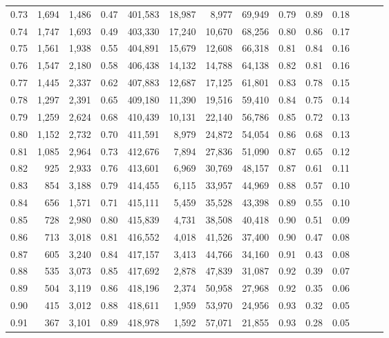 \begin{tabular}{rrrrrrrrrrrrrr}
0.73 &  1,694 &  1,486 &  0.47 &  401,583 &   18,987 &   8,977 &  69,949 &  0.79 &  0.89 &      0.18 \\
0.74 &  1,747 &  1,693 &  0.49 &  403,330 &   17,240 &  10,670 &  68,256 &  0.80 &  0.86 &      0.17 \\
0.75 &  1,561 &  1,938 &  0.55 &  404,891 &   15,679 &  12,608 &  66,318 &  0.81 &  0.84 &      0.16 \\
0.76 &  1,547 &  2,180 &  0.58 &  406,438 &   14,132 &  14,788 &  64,138 &  0.82 &  0.81 &      0.16 \\
0.77 &  1,445 &  2,337 &  0.62 &  407,883 &   12,687 &  17,125 &  61,801 &  0.83 &  0.78 &      0.15 \\
0.78 &  1,297 &  2,391 &  0.65 &  409,180 &   11,390 &  19,516 &  59,410 &  0.84 &  0.75 &      0.14 \\
0.79 &  1,259 &  2,624 &  0.68 &  410,439 &   10,131 &  22,140 &  56,786 &  0.85 &  0.72 &      0.13 \\
0.80 &  1,152 &  2,732 &  0.70 &  411,591 &    8,979 &  24,872 &  54,054 &  0.86 &  0.68 &      0.13 \\
0.81 &  1,085 &  2,964 &  0.73 &  412,676 &    7,894 &  27,836 &  51,090 &  0.87 &  0.65 &      0.12 \\
0.82 &    925 &  2,933 &  0.76 &  413,601 &    6,969 &  30,769 &  48,157 &  0.87 &  0.61 &      0.11 \\
0.83 &    854 &  3,188 &  0.79 &  414,455 &    6,115 &  33,957 &  44,969 &  0.88 &  0.57 &      0.10 \\
0.84 &    656 &  1,571 &  0.71 &  415,111 &    5,459 &  35,528 &  43,398 &  0.89 &  0.55 &      0.10 \\
0.85 &    728 &  2,980 &  0.80 &  415,839 &    4,731 &  38,508 &  40,418 &  0.90 &  0.51 &      0.09 \\
0.86 &    713 &  3,018 &  0.81 &  416,552 &    4,018 &  41,526 &  37,400 &  0.90 &  0.47 &      0.08 \\
0.87 &    605 &  3,240 &  0.84 &  417,157 &    3,413 &  44,766 &  34,160 &  0.91 &  0.43 &      0.08 \\
0.88 &    535 &  3,073 &  0.85 &  417,692 &    2,878 &  47,839 &  31,087 &  0.92 &  0.39 &      0.07 \\
0.89 &    504 &  3,119 &  0.86 &  418,196 &    2,374 &  50,958 &  27,968 &  0.92 &  0.35 &      0.06 \\
0.90 &    415 &  3,012 &  0.88 &  418,611 &    1,959 &  53,970 &  24,956 &  0.93 &  0.32 &      0.05 \\
0.91 &    367 &  3,101 &  0.89 &  418,978 &    1,592 &  57,071 &  21,855 &  0.93 &  0.28 &      0.05 \\

\end{tabular}
